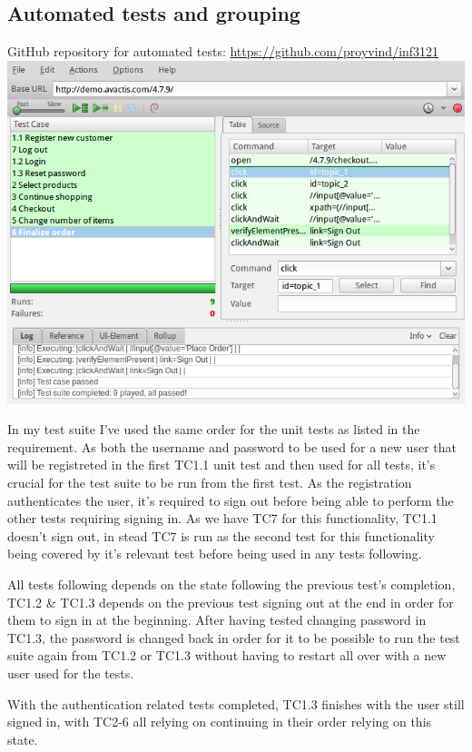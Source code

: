 \documentclass[USenglish]{article}
\begin{document}
\subsection{Automated tests and grouping}
GitHub repository for automated tests: \url{https://github.com/proyvind/inf3121}
\includegraphics{TestSuitePassed}

In my test suite I've used the same order for the unit tests as listed in
the requirement. As both the username and password to be used for a new user
that will be registreted in the first TC1.1 unit test and then used for all
tests, it's crucial for the test suite to be run from the first test.
As the registration authenticates the user, it's required to sign out before
being able to perform the other tests requiring signing in.
As we have TC7 for this functionality, TC1.1 doesn't sign out, in
stead TC7 is run as the second test for this functionality being
covered by it's relevant test before being used in any tests following.

All tests following depends on the state following the previous test's completion,
TC1.2 \& TC1.3 depends on the previous test signing out at the end in order
for them to sign in at the beginning. After having tested changing password in
TC1.3, the password is changed back in order for it to be possible to run the
test suite again from TC1.2 or TC1.3 without having to restart all over with a new
user used for the tests.


With the authentication related tests completed, TC1.3 finishes with the
user still signed in, with TC2-6 all relying on continuing in their
order relying on this state.
\end{document}
